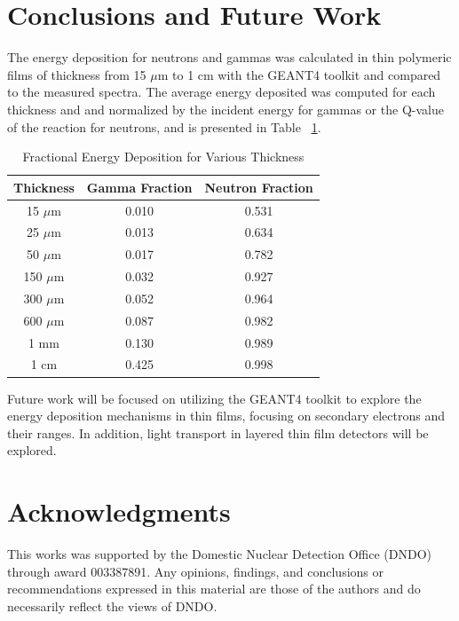 \documentclass{anstrans}
\newcommand{\micron}{$\mu$m }
\begin{document}
\section{Conclusions and Future Work}
The energy deposition for neutrons and gammas was calculated in thin polymeric films of thickness from 15 \micron to 1 cm with the GEANT4 toolkit and compared to the measured spectra.
The average energy deposited was computed for each thickness and and normalized by the incident energy for gammas or the Q-value of the reaction for neutrons, and is presented in Table ~\ref{tab:FractionEDep}.
\begin{table}[!htb]
    \caption{Fractional Energy Deposition for Various Thickness}
	\centering
	\begin{tabular}{c | c c}
	Thickness & Gamma Fraction & Neutron Fraction \\
	\hline
	\hline
	15 \micron & 0.010 & 0.531 \\
	25 \micron & 0.013 & 0.634 \\
	50 \micron & 0.017 & 0.782 \\
	150 \micron & 0.032 & 0.927 \\
	300 \micron & 0.052 & 0.964 \\
	600 \micron & 0.087 & 0.982 \\
	1 mm & 0.130 & 0.989 \\
	1 cm & 0.425 & 0.998 \\
	\hline
	\end{tabular}
    \label{tab:FractionEDep}
\end{table}
Future work will be focused on utilizing the GEANT4 toolkit to explore the energy deposition mechanisms in thin films, focusing on secondary electrons and their ranges. 
In addition, light transport in layered thin film detectors will be explored.
\section{Acknowledgments}
This works was supported by the Domestic Nuclear Detection Office (DNDO) through award 003387891.
Any opinions, findings, and conclusions or recommendations expressed in this material are those of the authors and do necessarily reflect the views of DNDO.


\end{document}
